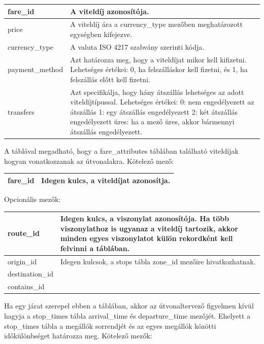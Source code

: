 \begin{tabular}{|p{3cm}|p{10cm}|}
\hline
fare\_id & A viteldíj azonosítója. \\
\hline
price & A viteldíj ára a currency\_type mezőben meghatározott egységben kifejezve. \\
\hline
currency\_type & A valuta ISO 4217 szabvány szerinti kódja. \\
\hline
payment\_method & Azt határozza meg, hogy a viteldíjat mikor kell kifizetni.
Lehetséges értékei:
0, ha felszálláskor kell fizetni, és
1, ha felszállás előtt kell fizetni. \\
\hline
transfers & Azt specifikálja, hogy hány átszállás lehetséges az adott viteldíjtípussal.
Lehetséges értékei:
0: nem engedélyezett az átszállás
1: egy átszállás engedélyezett
2: két átszállás engedélyezett
üres: ha a mező üres, akkor bármennyi átszállás engedélyezett. \\
\hline
\end{tabular}


A táblával megadható, hogy a fare\_attributes táblában található viteldíjak hogyan vonatkozzanak az útvonalakra.
Kötelező mező:

\begin{tabular}{|p{3cm}|p{10cm}|}
\hline
fare\_id & Idegen kulcs, a viteldíjat azonosítja. \\
\hline
\end{tabular}

Opcionális mezők:

\begin{tabular}{|p{3cm}|p{10cm}|}
\hline
route\_id & Idegen kulcs, a viszonylat azonosítója. Ha több viszonylathoz is ugyanaz a viteldíj tartozik, akkor minden egyes viszonylatot külön rekordként kell felvinni a táblában. \\
\hline
origin\_id & Idegen kulcsok, a stops tábla zone\_id mezőire hivatkozhatnak. \\
\hline
destination\_id &  \\
\hline
contains\_id & \\
\hline
\end{tabular}


Ha egy járat szerepel ebben a táblában, akkor az útvonaltervező figyelmen kívül hagyja a stop\_times tábla arrival\_time és departure\_time mezőjét. Ehelyett a stop\_times tábla a megállók sorrendjét és az egyes megállók közötti időkülönbséget határozza meg.
Kötelező mezők:

